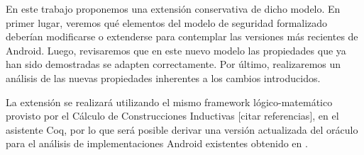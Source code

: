 En este trabajo proponemos una extensión conservativa de dicho modelo. En primer
lugar, veremos qué elementos del modelo de seguridad formalizado deberían modificarse
o extenderse para contemplar las versiones más recientes de Android. Luego,
revisaremos que en este nuevo modelo las propiedades que ya han sido demostradas se
adapten correctamente. Por último, realizaremos un análisis de las nuevas
propiedades inherentes a los cambios introducidos.

La extensión se realizará utilizando el mismo framework lógico-matemático
provisto por el Cálculo de Construcciones Inductivas [citar referencias], en el
asistente Coq, por lo que será posible derivar una versión actualizada del
oráculo para el análisis de implementaciones Android existentes obtenido en
\cite{fgorostiaga}.